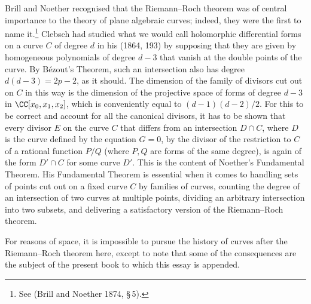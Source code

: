 Brill and Noether recognised that the Riemann--Roch theorem was of  central importance to the theory of plane algebraic curves; indeed, they were the first to name it.\footnote{See (Brill and Noether 1874, \S\,5).}  Clebsch had studied what we would call holomorphic differential forms on a curve $C$  of degree $d$ in his (1864, 193)  by supposing that they are given by homogeneous polynomials of degree $d-3$ that vanish at the double points of the curve. 
By B\'ezout's Theorem, such an intersection also has degree $d(d-3) = 2p-2$, as it should. The dimension of the family of divisors cut out on $C$ in this way is the dimension of the projective space of forms of degree $d-3$ in $\CC[x_0,x_1,x_2]$, which is conveniently equal to $(d-1)(d-2)/2$. For this to be correct and account for all the canonical divisors, it has to be shown that every divisor $E$ on the curve $C$ that differs from an intersection $D\cap C$, where $D$ is the curve defined by the equation $G = 0$,  by the divisor of the restriction to $C$ of a rational function $P/Q$ (where $P, Q$ are forms of the same degree), is again of the form $D'\cap C$ for some curve $D'$. This is the content of Noether's Fundamental Theorem. His Fundamental Theorem is essential when it comes  to handling  sets of points cut out on a fixed curve $C$ by families of curves, counting the degree of an intersection of two curves at multiple points,  dividing an arbitrary intersection into two subsets, and delivering a satisfactory version of the Riemann--Roch theorem. 

For reasons of space, it is impossible to pursue the history of curves after the Riemann--Roch theorem here, except to note that some of the consequences are the subject of the present book to which this essay is appended.












 

